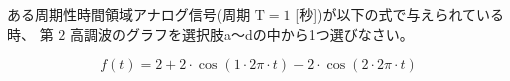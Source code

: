 ある周期性時間領域アナログ信号(周期 $\textrm{T} = 1$ [秒])が以下の式で与えられている時、
第 $2$ 高調波のグラフを選択肢a〜dの中から1つ選びなさい。

\[
f(t) = 
2
+ 2 \cdot \cos( 1 \cdot 2 \pi \cdot t )
- 2 \cdot \cos( 2 \cdot 2 \pi \cdot t )
\]
